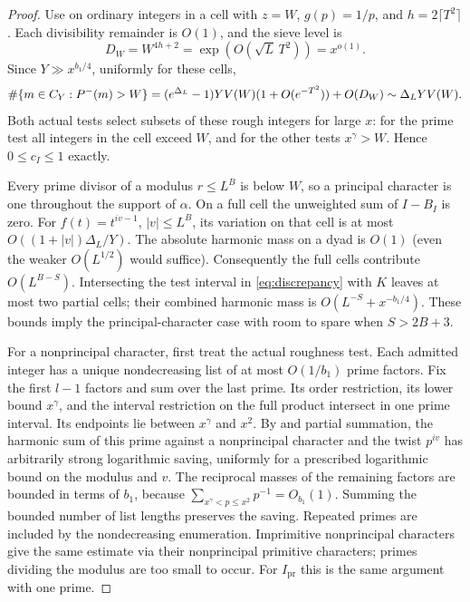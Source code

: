 \begin{proof}
Use  on ordinary integers in a cell with $z=W$,
$g(p)=1/p$, and $h=2\lceil T^2\rceil$. Each divisibility remainder
is $O(1)$, and the sieve level is
\[
 D_W=W^{4h+2}=\exp(O(\sqrt L\,T^2))=x^{o(1)}.
\]
Since $Y\gg x^{b_1/4}$, uniformly for these cells,
\begin{equation}\label{eq:proxy-denominator}
 \#\{m\in C_Y:P^{-}(m)>W\}
  =(e^{\Delta_L}-1)YV(W)(1+O(e^{-T^2}))+O(D_W)
  \sim\Delta_L YV(W).
\end{equation}
Both actual tests select subsets of these rough integers for large
$x$: for the prime test all integers in the cell exceed $W$, and
for the other tests $x^\gamma>W$. Hence $0\le c_I\le1$ exactly.

Every prime divisor of a modulus $r\le L^B$ is below $W$, so a
principal character is one throughout the support of $\alpha$.
On a full cell the unweighted sum of $I-B_I$ is zero. For
$f(t)=t^{iv-1}$, $|v|\le L^B$, its variation on that cell is at most
$O((1+|v|)\Delta_L/Y)$. The absolute harmonic mass on a dyad is
$O(1)$ (even the weaker $O(L^{1/2})$ would suffice). Consequently
the full cells contribute $O(L^{B-S})$. Intersecting the test
interval in \eqref{eq:discrepancy} with $K$ leaves at most two
partial cells; their combined harmonic mass is
$O(L^{-S}+x^{-b_1/4})$. These bounds imply the principal-character
case with room to spare when $S>2B+3$.

For a nonprincipal character, first treat the actual roughness
test. Each admitted integer has a unique nondecreasing list of
at most $O(1/b_1)$ prime factors. Fix the first $l-1$ factors and
sum over the last prime. Its order restriction, its lower bound
$x^\gamma$, and the interval restriction on the full product
intersect in one prime interval. Its endpoints lie between
$x^\gamma$ and $x^2$. By  and partial summation, the
harmonic sum of this prime against a nonprincipal character and
the twist $p^{iv}$ has arbitrarily strong logarithmic saving,
uniformly for a prescribed logarithmic bound on the modulus and
$v$. The reciprocal masses of the remaining factors are bounded
in terms of $b_1$, because
$\sum_{x^\gamma<p\le x^2}p^{-1}=O_{b_1}(1)$.
Summing the bounded number of list lengths preserves the saving.
Repeated primes are included by the nondecreasing enumeration.
Imprimitive nonprincipal characters give the same estimate via
their nonprincipal primitive characters; primes dividing the
modulus are too small to occur. For $I_{\mathrm{pr}}$ this is the
same argument with one prime.


\end{proof}
